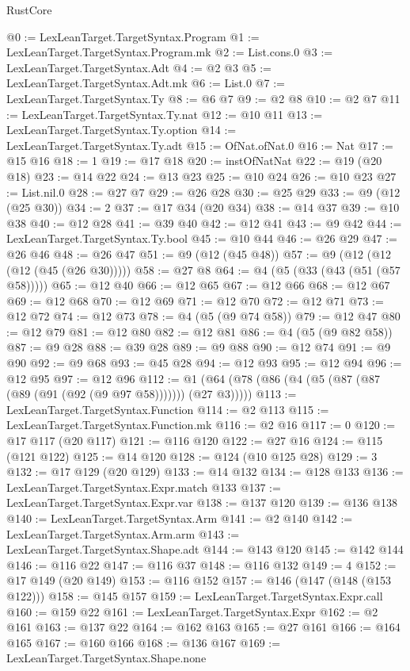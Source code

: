 \begin{lexlean}{RustCore}
\begin{coremodule}
@0 := LexLeanTarget.TargetSyntax.Program
@1 := LexLeanTarget.TargetSyntax.Program.mk
@2 := List.cons.{0}
@3 := LexLeanTarget.TargetSyntax.Adt
@4 := @2 @3
@5 := LexLeanTarget.TargetSyntax.Adt.mk
@6 := List.{0}
@7 := LexLeanTarget.TargetSyntax.Ty
@8 := @6 @7
@9 := @2 @8
@10 := @2 @7
@11 := LexLeanTarget.TargetSyntax.Ty.nat
@12 := @10 @11
@13 := LexLeanTarget.TargetSyntax.Ty.option
@14 := LexLeanTarget.TargetSyntax.Ty.adt
@15 := OfNat.ofNat.{0}
@16 := Nat
@17 := @15 @16
@18 := 1
@19 := @17 @18
@20 := instOfNatNat
@22 := @19 (@20 @18)
@23 := @14 @22
@24 := @13 @23
@25 := @10 @24
@26 := @10 @23
@27 := List.nil.{0}
@28 := @27 @7
@29 := @26 @28
@30 := @25 @29
@33 := @9 (@12 (@25 @30))
@34 := 2
@37 := @17 @34 (@20 @34)
@38 := @14 @37
@39 := @10 @38
@40 := @12 @28
@41 := @39 @40
@42 := @12 @41
@43 := @9 @42
@44 := LexLeanTarget.TargetSyntax.Ty.bool
@45 := @10 @44
@46 := @26 @29
@47 := @26 @46
@48 := @26 @47
@51 := @9 (@12 (@45 @48))
@57 := @9 (@12 (@12 (@12 (@45 (@26 @30)))))
@58 := @27 @8
@64 := @4 (@5 (@33 (@43 (@51 (@57 @58)))))
@65 := @12 @40
@66 := @12 @65
@67 := @12 @66
@68 := @12 @67
@69 := @12 @68
@70 := @12 @69
@71 := @12 @70
@72 := @12 @71
@73 := @12 @72
@74 := @12 @73
@78 := @4 (@5 (@9 @74 @58))
@79 := @12 @47
@80 := @12 @79
@81 := @12 @80
@82 := @12 @81
@86 := @4 (@5 (@9 @82 @58))
@87 := @9 @28
@88 := @39 @28
@89 := @9 @88
@90 := @12 @74
@91 := @9 @90
@92 := @9 @68
@93 := @45 @28
@94 := @12 @93
@95 := @12 @94
@96 := @12 @95
@97 := @12 @96
@112 := @1 (@64 (@78 (@86 (@4 (@5 (@87 (@87 (@89 (@91 (@92 (@9 @97 @58))))))) (@27 @3)))))
@113 := LexLeanTarget.TargetSyntax.Function
@114 := @2 @113
@115 := LexLeanTarget.TargetSyntax.Function.mk
@116 := @2 @16
@117 := 0
@120 := @17 @117 (@20 @117)
@121 := @116 @120
@122 := @27 @16
@124 := @115 (@121 @122)
@125 := @14 @120
@128 := @124 (@10 @125 @28)
@129 := 3
@132 := @17 @129 (@20 @129)
@133 := @14 @132
@134 := @128 @133
@136 := LexLeanTarget.TargetSyntax.Expr.match @133
@137 := LexLeanTarget.TargetSyntax.Expr.var
@138 := @137 @120
@139 := @136 @138
@140 := LexLeanTarget.TargetSyntax.Arm
@141 := @2 @140
@142 := LexLeanTarget.TargetSyntax.Arm.arm
@143 := LexLeanTarget.TargetSyntax.Shape.adt
@144 := @143 @120
@145 := @142 @144
@146 := @116 @22
@147 := @116 @37
@148 := @116 @132
@149 := 4
@152 := @17 @149 (@20 @149)
@153 := @116 @152
@157 := @146 (@147 (@148 (@153 @122)))
@158 := @145 @157
@159 := LexLeanTarget.TargetSyntax.Expr.call
@160 := @159 @22
@161 := LexLeanTarget.TargetSyntax.Expr
@162 := @2 @161
@163 := @137 @22
@164 := @162 @163
@165 := @27 @161
@166 := @164 @165
@167 := @160 @166
@168 := @136 @167
@169 := LexLeanTarget.TargetSyntax.Shape.none

\end{coremodule}
\end{lexlean}
